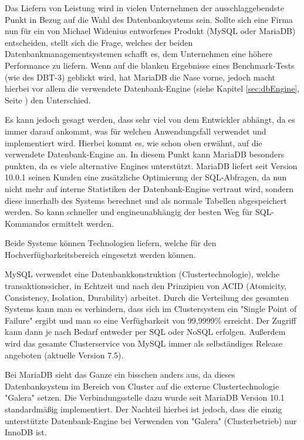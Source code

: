 
Das Liefern von Leistung wird in vielen Unternehmen der ausschlaggebendste Punkt in Bezug auf die Wahl des Datenbanksystems sein. Sollte sich eine Firma nun für ein von Michael Widenius entworfenes Produkt (MySQL oder MariaDB) entscheiden, stellt sich die Frage, welches der beiden Datenbankmanagementsystemen schafft es, dem Unternehmen eine höhere Performance zu liefern. Wenn auf die blanken Ergebnisse eines Benchmark-Tests (wie des DBT-3) geblickt wird, hat MariaDB die Nase vorne, jedoch macht hierbei vor allem die verwendete Datenbank-Engine (siehe Kapitel \ref{sec:dbEngine}, Seite \pageref{sec:dbEngine}) den Unterschied. \cite{MariaVsMy}

Es kann jedoch gesagt werden, dass sehr viel von dem Entwickler abhängt, da es immer darauf ankommt, was für welchen Anwendungsfall verwendet und implementiert wird. Hierbei kommt es, wie schon oben erwähnt, auf die verwendete Datenbank-Engine an. In diesem Punkt kann MariaDB besonders punkten, da es viele alternative Engines unterstützt. MariaDB liefert seit Version 10.0.1 seinen Kunden eine zusätzliche Optimierung der SQL-Abfragen, da nun nicht mehr auf interne Statistiken der Datenbank-Engine vertraut wird, sondern diese innerhalb des Systems berechnet und als normale Tabellen abgespeichert werden. So kann schneller und engineunabhängig der besten Weg für SQL-Kommandos ermittelt werden. \cite{MariaVsMy}


Beide Systeme können Technologien liefern, welche für den Hochverfügbarkeitsbereich eingesetzt werden können.

MySQL verwendet eine Datenbankkonstruktion (Clustertechnologie), welche transaktionssicher, in Echtzeit und nach den Prinzipien von ACID (Atomicity, Consistency, Isolation, Durability) arbeitet. Durch die Verteilung des gesamten Systems kann man es verhindern, dass sich im Clustersystem ein "Single Point of Failure" ergibt und man so eine Verfügbarkeit von 99,9999\% erreicht. Der Zugriff kann dann je nach Bedarf entweder per SQL oder NoSQL erfolgen. Außerdem wird das gesamte Clusterservice von MySQL immer als selbständiges Release angeboten (aktuelle Version 7.5). \cite{MariaVsMy}

Bei MariaDB sieht das Ganze ein bisschen anders aus, da dieses Datenbanksystem im Bereich von Cluster auf die externe Clustertechnologie "Galera" setzen. Die Verbindungsstelle dazu wurde seit MariaDB Version 10.1 standardmäßig implementiert. Der Nachteil hierbei ist jedoch, dass die einzig unterstützte Datenbank-Engine bei Verwenden von "Galera" (Clusterbetrieb) nur InnoDB ist. \cite{MariaVsMy}

